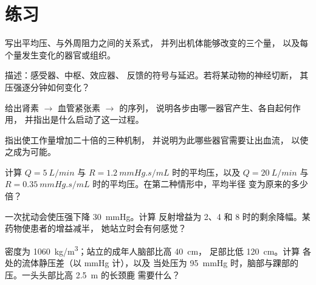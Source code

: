 \section{练习}

\begin{exercise}[$\star$]\label{exo:b2:blood-pressure:1}
写出平均压、与外周阻力之间的关系式，
并列出机体能够改变的三个量，
以及每个量发生变化的器官或组织。
\end{exercise}

\begin{exercise}[$\star$]\label{exo:b2:blood-pressure:2}
描述：感受器、中枢、效应器、
反馈的符号与延迟。若将某动物的神经切断，
其压强逐分钟如何变化？
\end{exercise}

\begin{exercise}[$\star$]\label{exo:b2:blood-pressure:3}
给出肾素 $\to$ 血管紧张素 $\to$ 的序列，
说明各步由哪一器官产生、各自起何作用，
并指出是什么启动了这一过程。
\end{exercise}

\begin{exercise}[$\star$]\label{exo:b2:blood-pressure:4}
指出使工作量增加二十倍的三种机制，
并说明为此哪些器官需要让出血流，
以使之成为可能。
\end{exercise}

\begin{exercise}[$\star\star$]\label{exo:b2:blood-pressure:5}
计算 $Q = \qty{5}{L/min}$ 与 $R =
\qty{1.2}{mmHg.s/mL}$ 时的平均压，以及 $Q = \qty{20}{L/min}$ 与 $R =
\qty{0.35}{mmHg.s/mL}$ 时的平均压。在第二种情形中，平均半径
变为原来的多少倍？
\end{exercise}

\begin{exercise}[$\star\star$]\label{exo:b2:blood-pressure:6}
一次扰动会使压强下降 \qty{30}{mmHg}。计算
反射增益为 2、4 和 8 时的剩余降幅。某药物使患者的增益减半，
她站立时会有何感觉？
\end{exercise}

\begin{exercise}[$\star\star$]\label{exo:b2:blood-pressure:7}
密度为 \qty{1060}{kg/m^3}；站立的成年人脑部比高 \qty{40}{cm}，
足部比低 \qty{120}{cm}。计算
各处的流体静压差（以 mmHg 计），以及
当处压为
\qty{95}{mmHg} 时，脑部与踝部的压。一头头部比高 \qty{2.5}{m} 的长颈鹿
需要什么？
\end{exercise}

